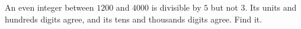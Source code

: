An even integer between $1200$ and $4000$ is divisible by $5$ but not $3$. Its units and hundreds digits agree, and its tens and thousands digits agree. Find it.
